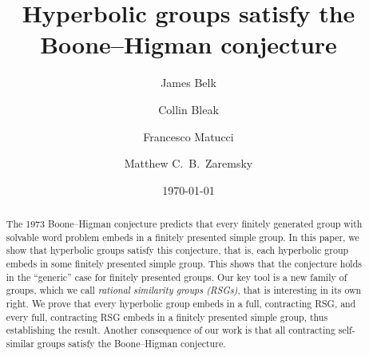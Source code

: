 \documentclass[11pt,letterpaper]{amsart}
\theoremstyle{definition}
\begin{document}
\title{Hyperbolic groups satisfy the Boone--Higman conjecture}

\date{\today}


\author[J.~Belk]{James Belk}
\address{University of Glasgow, Glasgow, Scotland}

\author[C.~Bleak]{Collin Bleak}
\address{University of St Andrews, St Andrews, Scotland}

\author[F.~Matucci]{Francesco Matucci}
\address{Universit\`{a} di Milano--Bicocca, Milan, Italy}

\author[M.~C.~B.~Zaremsky]{Matthew C.~B.~Zaremsky}
\address{Department of Mathematics and Statistics, University at Albany (SUNY), Albany, NY}


\begin{abstract}
The 1973 Boone--Higman conjecture predicts that every finitely generated group with solvable word problem embeds in a finitely presented simple group. In this paper, we show that hyperbolic groups satisfy this conjecture, that is, each hyperbolic group embeds in some finitely presented simple group. This shows that the conjecture holds in the ``generic'' case for finitely presented groups. Our key tool is a new family of groups, which we call \emph{rational similarity groups (RSGs)}, that is interesting in its own right. We prove that every hyperbolic group embeds in a full, contracting RSG, and every full, contracting RSG embeds in a finitely presented simple group, thus establishing the result. Another consequence of our work is that all contracting self-similar groups satisfy the Boone--Higman conjecture.
\end{abstract}

\maketitle
\tableofcontents
\thispagestyle{empty}
\end{document}
